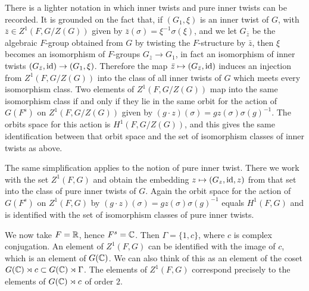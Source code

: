 \documentclass{article}
\theoremstyle{definition}
\numberwithin{equation}{section}
\renewcommand{\-}{\hyp{}}
\begin{document}
There is a lighter notation in which inner twists and pure inner twists can be recorded. It is grounded on the fact that, if $(G_1,\xi)$ is an inner twist of $G$, with $\bar z \in Z^1(F,G/Z(G))$ given by $\bar z(\sigma)=\xi^{-1}\sigma(\xi)$, and we let $G_{\bar z}$ be the algebraic $F$-group obtained from $G$ by twisting the $F$-structure by $\bar z$, then $\xi$ becomes an isomorphism of $F$-groups $G_{\bar z} \to G_1$, in fact an isomorphism of inner twists $(G_{\bar z},\textrm{id}) \to (G_1,\xi)$. Therefore the map $\bar z \mapsto (G_{\bar z},\textrm{id})$ induces an injection from $Z^1(F,G/Z(G))$ into the class of all inner twists of $G$ which meets every isomorphism class. Two elements of $Z^1(F,G/Z(G))$ map into the same isomorphism class if and only if they lie in the same orbit for the action of $G(F^s)$ on $Z^1(F,G/Z(G))$ given by $(g \cdot z)(\sigma) = gz(\sigma)\sigma(g)^{-1}$. The orbits space for this action is $H^1(F,G/Z(G))$, and this gives the same identification between that orbit space and the set of isomorphism classes of inner twists as above.

The same simplification applies to the notion of pure inner twist. There we work with the set $Z^1(F,G)$ and obtain the embedding $z \mapsto (G_z,\textrm{id},z)$ from that set into the class of pure inner twists of $G$. Again the orbit space for the action of $G(F^s)$ on $Z^1(F,G)$ by $(g\cdot z)(\sigma)=gz(\sigma)\sigma(g)^{-1}$ equals $H^1(F,G)$ and is identified with the set of isomorphism classes of pure inner twists.

We now take $F=\mathbb{R}$, hence $F^s=\mathbb{C}$. Then $\Gamma=\{1,c\}$, where $c$ is complex conjugation. An element of $Z^1(F,G)$ can be identified with the image of $c$, which is an element of $G(\mathbb{C})$. We can also think of this as an element of the coset $G(\mathbb{C}) \rtimes c \subset G(\mathbb{C}) \rtimes \Gamma$. The elements of $Z^1(F,G)$ correspond precisely to the elements of $G(\mathbb{C}) \rtimes c$ of order $2$.
\end{document}
